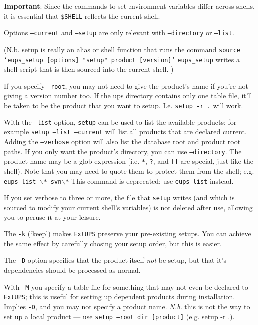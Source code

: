 \documentclass{article}
\newcommand{\code}[1]{\texttt{#1}}
\newcommand{\eups}{\code{ExtUPS}}
\begin{document}
\begin{itemize}
\textbf{Important}: Since the commands to set environment variables differ across shells,
it is essential that \code{\$SHELL} reflects the current shell.

Options \code{--current} and \code{--setup} are only relevant with \code{--directory}
or \code{--list}.

(N.b. setup is really an alias or shell function that runs the command\hfil\break
\code{source `eups\_setup [options] "setup" product [version]`}\hfil\break
\code{eups\_setup} writes a shell script that is then sourced into the
current shell.
)

If you specify \code{--root}, you may not need to give the
product's name if you're not giving a version number too.
If the ups directory contains only one
table file, it'll be taken to be the product that you
want to setup.  I.e. \code{setup -r .} will work.

With the \code{--list} option, \code{setup} can be used to list the available
products; for example \code{setup --list --current} will list all products that
are declared current. Adding the \code{--verbose} option will also
list the database root and product root paths.  If you only want the product's
directory, you can use \code{--directory}.
The product name may be a glob expression (i.e. \code{*}, \code{?},
and \code{[]} are special, just like the shell).  Note that you may
need to quote them to protect them from the shell; e.g. \code{eups list $\backslash$* svn$\backslash$*}
This command is deprecated; use \code{eups list} instead.

If you set verbose to three or more, the file that \code{setup} writes (and
which is sourced to modify your current shell's variables) is not deleted
after use, allowing you to peruse it at your leisure.

The \code{-k} (`keep') makes \eups{} preserve your pre-existing setups.
You can achieve the same effect
by carefully chosing your setup order, but this is easier.

The \code{-D} option specifies that the product itself \textit{not} be
setup, but that it's dependencies should be processed as normal.

With \code{-M} you specify a table file for something that may not
even be declared to \eups{}; this is useful for setting up dependent
products during installation.  Implies \code{-D}, and you may not
specify a product name. \emph{N.b.} this is not the way to set up
a local product --- use \code{setup --root dir [product]} (e.g. setup -r .).


\end{itemize}
\end{document}
